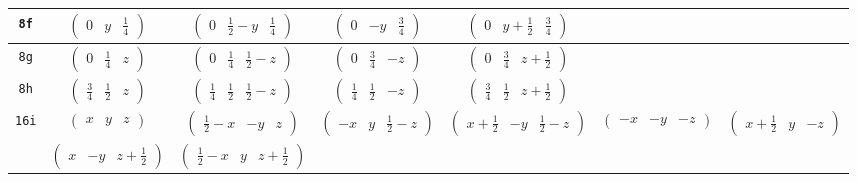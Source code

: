 \documentclass[fleqn,9pt,landscape]{jsarticle}
\begin{document}
\begin{center}
\begin{longtable}{ccccccc}
{\tt 8f} & $ \begin{pmatrix} 0 & y & \frac{1}{4} \end{pmatrix} $ & $ \begin{pmatrix} 0 & \frac{1}{2} - y & \frac{1}{4} \end{pmatrix} $ & $ \begin{pmatrix} 0 & - y & \frac{3}{4} \end{pmatrix} $ & $ \begin{pmatrix} 0 & y + \frac{1}{2} & \frac{3}{4} \end{pmatrix} $ & $  $ & $  $ \\ \hline
{\tt 8g} & $ \begin{pmatrix} 0 & \frac{1}{4} & z \end{pmatrix} $ & $ \begin{pmatrix} 0 & \frac{1}{4} & \frac{1}{2} - z \end{pmatrix} $ & $ \begin{pmatrix} 0 & \frac{3}{4} & - z \end{pmatrix} $ & $ \begin{pmatrix} 0 & \frac{3}{4} & z + \frac{1}{2} \end{pmatrix} $ & $  $ & $  $ \\ \hline
{\tt 8h} & $ \begin{pmatrix} \frac{3}{4} & \frac{1}{2} & z \end{pmatrix} $ & $ \begin{pmatrix} \frac{1}{4} & \frac{1}{2} & \frac{1}{2} - z \end{pmatrix} $ & $ \begin{pmatrix} \frac{1}{4} & \frac{1}{2} & - z \end{pmatrix} $ & $ \begin{pmatrix} \frac{3}{4} & \frac{1}{2} & z + \frac{1}{2} \end{pmatrix} $ & $  $ & $  $ \\ \hline
{\tt 16i} & $ \begin{pmatrix} x & y & z \end{pmatrix} $ & $ \begin{pmatrix} \frac{1}{2} - x & - y & z \end{pmatrix} $ & $ \begin{pmatrix} - x & y & \frac{1}{2} - z \end{pmatrix} $ & $ \begin{pmatrix} x + \frac{1}{2} & - y & \frac{1}{2} - z \end{pmatrix} $ & $ \begin{pmatrix} - x & - y & - z \end{pmatrix} $ & $ \begin{pmatrix} x + \frac{1}{2} & y & - z \end{pmatrix} $ \\
& $ \begin{pmatrix} x & - y & z + \frac{1}{2} \end{pmatrix} $ & $ \begin{pmatrix} \frac{1}{2} - x & y & z + \frac{1}{2} \end{pmatrix} $ & $  $ & $  $ & $  $ & $  $ \\
\end{longtable}
\end{center}
\end{document}
